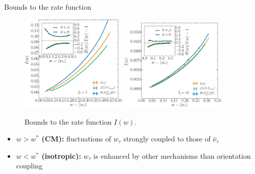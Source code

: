 \documentclass{beamer}
\begin{document}
\begin{frame}{Bounds to the rate function}

\begin{figure}
\centering
\includegraphics[width=0.45\textwidth]{boundRate.eps}
\includegraphics[width=0.45\textwidth]{boundRate40.eps}
\caption{Bounds to the rate function $I(w)$. }
\end{figure}

\begin{itemize}
  \item {\bf $w > w^*$ (CM):} fluctuations of $w_{\tau}$ strongly coupled to those of $\bar{\nu}_{\tau}$
  \item {\bf $w < w^*$ (isotropic):} $w_{\tau}$ is enhanced by other mechanisms than orientation coupling
\end{itemize}

\end{frame}
\end{document}
